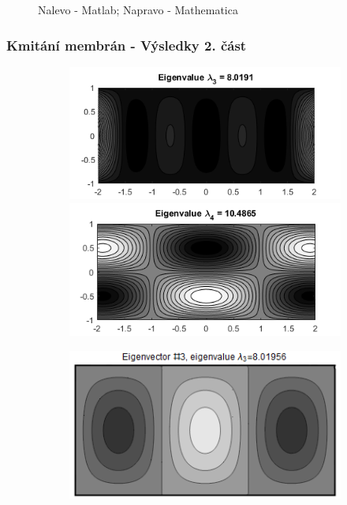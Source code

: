 \documentclass[xcolor=table]{beamer}
\begin{document}
\begin{frame}
\begin{figure}
\begin{subfigure}{.5\textwidth}
\end{subfigure}
\caption{Nalevo - Matlab; Napravo - Mathematica}
\end{figure}
\end{frame}


\begin{frame}
\frametitle{Kmitání membrán - Výsledky 2. část}

\begin{figure}
\centering
\begin{subfigure}{.5\textwidth}
\centering
\includegraphics[width=1\linewidth]{obdelnicky21.png}
\includegraphics[width=1\linewidth]{obdelnicky22.png}
\end{subfigure}%
\begin{subfigure}{.5\textwidth}
\centering
\includegraphics[width=.95\linewidth]{rectangle-eigenvector-3.png}

\end{subfigure}
\end{figure}
\end{frame}
\end{document}
